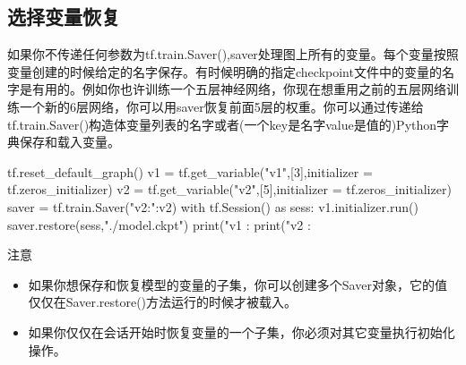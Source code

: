 \subsection{选择变量恢复}
如果你不传递任何参数为tf.train.Saver(),saver处理图上所有的变量。每个变量按照变量创建的时候给定的名字保存。有时候明确的指定checkpoint文件中的变量的名字是有用的。例如你也许训练一个五层神经网络，你现在想重用之前的五层网络训练一个新的6层网络，你可以用saver恢复前面5层的权重。你可以通过传递给tf.train.Saver()构造体变量列表的名字或者(一个key是名字value是值的)Python字典保存和载入变量。
\begin{python}
tf.reset_default_graph()
	v1 = tf.get_variable("v1",[3],initializer = tf.zeros_initializer)
	v2 = tf.get_variable("v2",[5],initializer = tf.zeros_initializer)
	saver = tf.train.Saver({"v2:":v2})
	with tf.Session() as sess:
	    v1.initializer.run()
	    saver.restore(sess,"./model.ckpt")
	    print("v1 : %
	    print("v2 : %
\end{python}
注意
\begin{itemize}
	\item 如果你想保存和恢复模型的变量的子集，你可以创建多个Saver对象，它的值仅仅在Saver.restore()方法运行的时候才被载入。
	\item 如果你仅仅在会话开始时恢复变量的一个子集，你必须对其它变量执行初始化操作。
\end{itemize}
